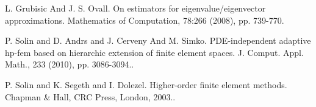 
\begin{thebibliography}{10}

{\sc L. Grubisic And J. S. Ovall}. {On estimators for eigenvalue/eigenvector approximations}. Mathematics of Computation, 78:266 (2008), pp. 739-770.



{\sc P. Solin and D. Andrs and J. Cerveny And M. Simko}. {PDE-independent adaptive hp-fem based on hierarchic extension of finite element spaces}. J. Comput. Appl. Math., 233 (2010), pp. 3086-3094..



{\sc P. Solin and K. Segeth and I. Dolezel}. {Higher-order finite element methods}. Chapman \& Hall, CRC Press, London, 2003..

\end{thebibliography}

